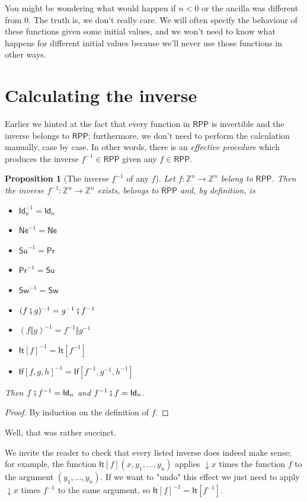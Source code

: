 \documentclass{book}
\theoremstyle{definition}
\theoremstyle{remark}
\theoremstyle{plain}
\newtheorem{proposition}{Proposition}
\newcommand{\ZZ}{\mathbb{Z}}
\newcommand{\RPP}{\mathsf{RPP}}
\newcommand{\rppId}{\mathsf{Id}}
\newcommand{\rppNe}{\mathsf{Ne}}
\newcommand{\rppSu}{\mathsf{Su}}
\newcommand{\rppPr}{\mathsf{Pr}}
\newcommand{\rppSw}{\mathsf{Sw}}
\newcommand{\rppCo}{\fatsemi}
\newcommand{\rppPa}{\Vert}
\newcommand{\rppIt}{\mathsf{It}}
\newcommand{\rppIf}{\mathsf{If}}
\begin{document}
You might be wondering what would happen if $n < 0$ or the ancilla was different from $0$.
The truth is, we don't really care.
We will often specify the behaviour of these functions given some initial values,
and we won't need to know what happens for different initial values because we'll never use those functions in other ways.

\section{Calculating the inverse}

Earlier we hinted at the fact that every function in $\RPP$ is invertible and the inverse belongs to $\RPP$;
furthermore, we don't need to perform the calculation manually, case by case.
In other words, there is an \textit{effective procedure} which produces the inverse $f^{-1} \in \RPP$ given any $f \in \RPP$.

\begin{proposition}[The inverse $f^{-1}$ of any $f$]
\label{rppinv}
Let $f : \ZZ^n \to \ZZ^n$ belong to $\RPP$.
Then the inverse $f^{-1} : \ZZ^n \to \ZZ^n$ exists, belongs to $\RPP$ and, by definition, is
\begin{itemize}
\item $\rppId_n^{-1} = \rppId_n$
\item $\rppNe^{-1} = \rppNe$
\item $\rppSu^{-1} = \rppPr$
\item $\rppPr^{-1} = \rppSu$
\item $\rppSw^{-1} = \rppSw$
\item $(f \rppCo g)^{-1} = g^{-1} \rppCo f^{-1}$
\item $(f \rppPa g)^{-1} = f^{-1} \rppPa g^{-1}$
\item ${\rppIt[f]}^{-1} = \rppIt[f^{-1}]$
\item ${\rppIf[f, g, h]}^{-1} = \rppIf [f^{-1}, g^{-1}, h^{-1}]$
\end{itemize}
Then $f \rppCo f^{-1} = \rppId_n$ and $f^{-1} \rppCo f = \rppId_n$.
\end{proposition}
\begin{proof}
By induction on the definition of $f$.
\end{proof}

Well, that was rather succinct.

We invite the reader to check that every listed inverse does indeed make sense;
for example, the function $\rppIt[f] (x, y_1, \dots, y_n)$ applies $\downarrow x$ times the function $f$ to the argument $(y_1, \dots, y_n)$.
If we want to "undo" this effect we just need to apply $\downarrow x$ times $f^{-1}$ to the same argument, so
${\rppIt[f]}^{-1} = \rppIt[f^{-1}]$.
\end{document}
